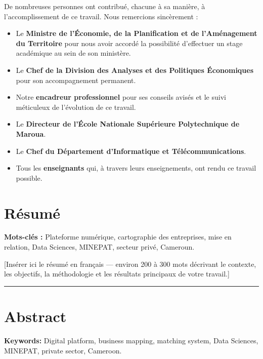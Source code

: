 \documentclass[12pt, a4paper, oneside]{report}
\begin{document}
De nombreuses personnes ont contribué, chacune à sa manière, à l'accomplissement de ce travail. Nous remercions sincèrement :

\begin{itemize}
  \item Le \textbf{Ministre de l'Économie, de la Planification et de l'Aménagement du Territoire} pour nous avoir accordé la possibilité d'effectuer un stage académique au sein de son ministère.
  \item Le \textbf{Chef de la Division des Analyses et des Politiques Économiques} pour son accompagnement permanent.
  \item Notre \textbf{encadreur professionnel} pour ses conseils avisés et le suivi méticuleux de l'évolution de ce travail.
  \item Le \textbf{Directeur de l'École Nationale Supérieure Polytechnique de Maroua}.
  \item Le \textbf{Chef du Département d'Informatique et Télécommunications}.
  \item Tous les \textbf{enseignants} qui, à travers leurs enseignements, ont rendu ce travail possible.
\end{itemize}

\chapter*{Résumé}
\thispagestyle{plain}

\textbf{Mots-clés :} Plateforme numérique, cartographie des entreprises, mise en relation, Data Sciences, MINEPAT, secteur privé, Cameroun.

\medskip

[Insérer ici le résumé en français — environ 200 à 300 mots décrivant le contexte, les objectifs, la méthodologie et les résultats principaux de votre travail.]

\vspace{1cm}

\begin{center}
  \rule{0.5\linewidth}{0.4pt}
\end{center}

\chapter*{Abstract}
\thispagestyle{plain}

\textbf{Keywords:} Digital platform, business mapping, matching system, Data Sciences, MINEPAT, private sector, Cameroon.
\end{document}
